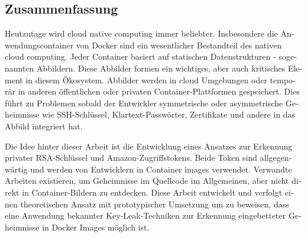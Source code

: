 \begin{otherlanguage}{ngerman}
\chapter*{Zusammenfassung}
Heutzutage wird cloud native computing immer beliebter. Insbesondere die Anwendungscontainer von Docker sind ein wesentlicher Bestandteil des nativen cloud computing. Jeder Container basiert auf statischen Datenstrukturen - sogenannten Abbildern. Diese Abbilder formen ein wichtiges, aber auch kritisches Element in diesem Ökosystem.
Abbilder werden in cloud Umgebungen oder temporär in anderen öffentlichen oder privaten Container-Plattformen gespeichert. Dies führt zu Problemen sobald der Entwickler symmetrische oder asymmetrische Geheimnisse wie SSH-Schlüssel, Klartext-Passwörter, Zertifikate und andere in das Abbild integriert hat.

Die Idee hinter dieser Arbeit ist die Entwicklung eines Ansatzes zur Erkennung privater RSA-Schlüssel und Amazon-Zugriffstokens. Beide Token sind allgegenwärtig und werden von Entwicklern in Container images verwendet. Verwandte Arbeiten existieren, um Geheimnisse im Quellcode im Allgemeinen, aber nicht direkt in Container-Bildern zu entdecken. Diese Arbeit entwickelt und verfolgt einen theoretischen Ansatz mit prototypischer Umsetzung um zu beweisen, dass eine Anwendung bekannter Key-Leak-Techniken zur Erkennung eingebetteter Geheimnisse in Docker Images möglich ist.
\end{otherlanguage}
